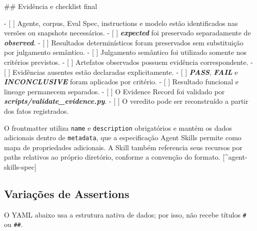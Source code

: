 \documentclass[
  10pt,
  a4paper,
  oneside]{book}
\newenvironment{Shaded}{}{}
\newcommand{\FunctionTok}[1]{\textcolor[rgb]{0.02,0.16,0.49}{#1}}
\newcommand{\InformationTok}[1]{\textcolor[rgb]{0.38,0.63,0.69}{\textbf{\textit{#1}}}}
\newcommand{\NormalTok}[1]{#1}
\newcommand{\SpecialStringTok}[1]{\textcolor[rgb]{0.73,0.40,0.53}{#1}}
\newcommand{\VariableTok}[1]{\textcolor[rgb]{0.10,0.09,0.49}{#1}}
\renewenvironment{Shaded}{\begin{snugshade}}{\end{snugshade}}%
\begin{document}
\begin{Shaded}
\begin{Highlighting}[]
\FunctionTok{\#\# Evidência e checklist final}

\SpecialStringTok{{-} }\VariableTok{[ ]}\NormalTok{ Agente, corpus, Eval Spec, instructions e modelo estão identificados nas versões ou snapshots necessários.}
\SpecialStringTok{{-} }\VariableTok{[ ]} \InformationTok{\textasciigrave{}expected\textasciigrave{}}\NormalTok{ foi preservado separadamente de }\InformationTok{\textasciigrave{}observed\textasciigrave{}}\NormalTok{.}
\SpecialStringTok{{-} }\VariableTok{[ ]}\NormalTok{ Resultados determinísticos foram preservados sem substituição por julgamento semântico.}
\SpecialStringTok{{-} }\VariableTok{[ ]}\NormalTok{ Julgamento semântico foi utilizado somente nos critérios previstos.}
\SpecialStringTok{{-} }\VariableTok{[ ]}\NormalTok{ Artefatos observados possuem evidência correspondente.}
\SpecialStringTok{{-} }\VariableTok{[ ]}\NormalTok{ Evidências ausentes estão declaradas explicitamente.}
\SpecialStringTok{{-} }\VariableTok{[ ]} \InformationTok{\textasciigrave{}PASS\textasciigrave{}}\NormalTok{, }\InformationTok{\textasciigrave{}FAIL\textasciigrave{}}\NormalTok{ e }\InformationTok{\textasciigrave{}INCONCLUSIVE\textasciigrave{}}\NormalTok{ foram aplicados por critério.}
\SpecialStringTok{{-} }\VariableTok{[ ]}\NormalTok{ Resultado funcional e lineage permanecem separados.}
\SpecialStringTok{{-} }\VariableTok{[ ]}\NormalTok{ O Evidence Record foi validado por }\InformationTok{\textasciigrave{}scripts/validate\_evidence.py\textasciigrave{}}\NormalTok{.}
\SpecialStringTok{{-} }\VariableTok{[ ]}\NormalTok{ O veredito pode ser reconstruído a partir dos fatos registrados.}
\end{Highlighting}
\end{Shaded}

O frontmatter utiliza \texttt{name} e \texttt{description} obrigatórios
e mantém os dados adicionais dentro de \texttt{metadata}, que a
especificação Agent Skills permite como mapa de propriedades adicionais.
A Skill também referencia seus recursos por paths relativos ao próprio
diretório, conforme a convenção do formato. {[}\^{}agent-skills-spec{]}

\hypertarget{variauxe7uxf5es-de-assertions}{%
\subsection{Variações de
Assertions}\label{variauxe7uxf5es-de-assertions}}

O YAML abaixo usa a estrutura nativa de dados; por isso, não recebe
títulos \texttt{\#} ou \texttt{\#\#}.
\end{document}
